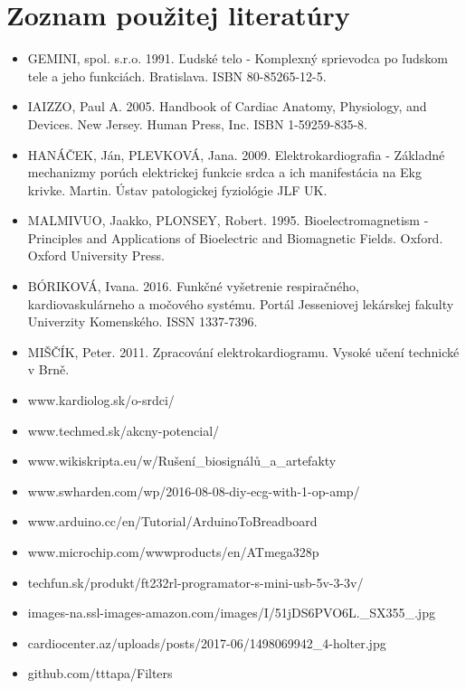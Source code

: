 \documentclass[titlepage]{article}
\begin{document}
\section*{Zoznam použitej literatúry}
\begin{itemize}
\item GEMINI, spol. s.r.o. 1991. Ľudské telo - Komplexný sprievodca po ľudskom tele a jeho funkciách. Bratislava. ISBN 80-85265-12-5.
\item IAIZZO, Paul A. 2005. Handbook of Cardiac Anatomy, Physiology, and Devices. New Jersey. Human Press, Inc. ISBN 1-59259-835-8.
\item HANÁČEK, Ján, PLEVKOVÁ, Jana. 2009. Elektrokardiografia - Základné mechanizmy porúch elektrickej funkcie srdca a ich manifestácia na Ekg krivke. Martin. Ústav patologickej fyziológie JLF UK.
\item MALMIVUO, Jaakko, PLONSEY, Robert. 1995. Bioelectromagnetism - Principles and Applications of Bioelectric and Biomagnetic Fields. Oxford. Oxford University Press.
\item BÓRIKOVÁ, Ivana. 2016. Funkčné vyšetrenie respiračného, kardiovaskulárneho a močového systému. Portál Jesseniovej lekárskej fakulty Univerzity Komenského. ISSN 1337-7396.
\item MIŠČÍK, Peter. 2011. Zpracování elektrokardiogramu. Vysoké učení technické v Brně. 
\item www.kardiolog.sk/o-srdci/
\item www.techmed.sk/akcny-potencial/
\item www.wikiskripta.eu/w/Rušení\_biosignálů\_a\_artefakty
\item www.swharden.com/wp/2016-08-08-diy-ecg-with-1-op-amp/
\item www.arduino.cc/en/Tutorial/ArduinoToBreadboard
\item www.microchip.com/wwwproducts/en/ATmega328p
\item techfun.sk/produkt/ft232rl-programator-s-mini-usb-5v-3-3v/
\item images-na.ssl-images-amazon.com/images/I/51jDS6PVO6L.\_SX355\_.jpg
\item cardiocenter.az/uploads/posts/2017-06/1498069942\_4-holter.jpg
\item github.com/tttapa/Filters

\end{itemize}
\end{document}
